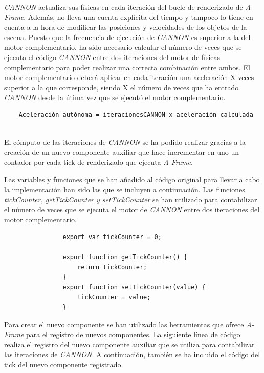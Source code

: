 \normalsize
\textit{CANNON} actualiza sus físicas en cada iteración del bucle de renderizado de \textit{A-Frame}. Además, no lleva una cuenta explícita del tiempo y tampoco lo tiene en cuenta a la hora de modificar las posiciones y velocidades de los objetos de la escena. Puesto que la frecuencia de ejecución de \textit{CANNON} es superior a la del motor complementario, ha sido necesario calcular el número de veces que se ejecuta el código \textit{CANNON} entre dos iteraciones del motor de físicas complementario para poder realizar una correcta combinación entre ambos. El motor complementario deberá aplicar en cada iteración una aceleración X veces superior a la que corresponde, siendo X el número de veces que ha entrado \textit{CANNON} desde la útima vez que se ejecutó el motor complementario. \newline

\small {
\begin{verbatim}
    Aceleración autónoma = iteracionesCANNON x aceleración calculada
    
\end{verbatim}
}

\normalsize
El cómputo de las iteraciones de \textit{CANNON} se ha podido realizar gracias a la creación de un nuevo componente auxiliar que hace incrementar en uno un contador por cada tick de renderizado que ejecuta \textit{A-Frame}. \newline


Las variables y funciones que se han añadido al código original para llevar a cabo la implementación han sido las que se incluyen a continuación. Las funciones \textit{tickCounter, getTickCounter y setTickCounter} se han utilizado para contabilizar el número de veces que se ejecuta el motor de \textit{CANNON} entre dos iteraciones del motor complementario.

\small {
\begin{verbatim}
                export var tickCounter = 0;
                
                export function getTickCounter() {
                    return tickCounter;
                }
                export function setTickCounter(value) {
                    tickCounter = value;
                }
\end{verbatim}
}

\normalsize
Para crear el nuevo componente se han utilizado las herramientas que ofrece \textit{A-Frame} para el registro de nuevos componentes. La siguiente línea de código realiza el registro del nuevo componente auxiliar que se utiliza para contabilizar las iteraciones de \textit{CANNON}. A continuación, también se ha incluido el código del tick del nuevo componente registrado.

